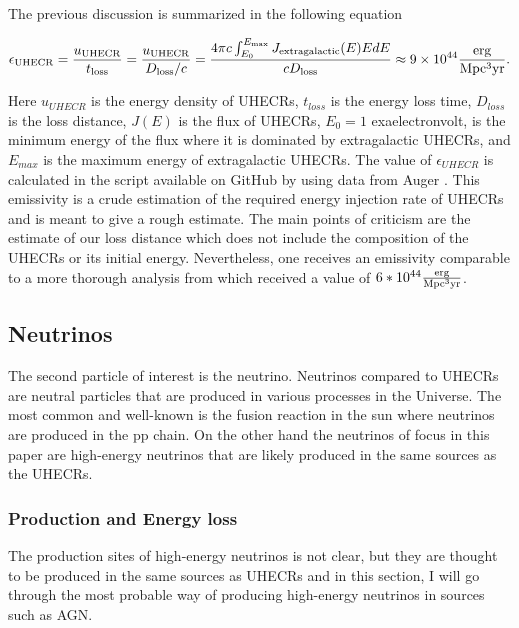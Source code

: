 The previous discussion is summarized in the following equation 

\begin{equation}
    \epsilon_{\rm UHECR} = \frac{u_{\rm UHECR}}{t_{\rm loss}} = \frac{u_{\rm UHECR}}{D_{\rm loss}/c} = \frac{4\pi c \int_{E_0}^{E_{\rm max}}J_{\rm extragalactic}(E)E dE}{c D_{\rm loss}} \approx 9\times 10^{44} \frac{\rm erg}{\rm Mpc^3 \rm yr}.
\end{equation}

Here $u_{UHECR}$ is the energy density of UHECRs, $t_{loss}$ is the energy loss time, $D_{loss}$ is the loss distance, $J(E)$ is the flux of UHECRs, $E_0 = 1$ exaelectronvolt, is the minimum energy of the flux where it is dominated by extragalactic UHECRs, and $E_{max}$ is the maximum energy of extragalactic UHECRs.
The value of $\epsilon_{UHECR}$ is calculated in the script available on GitHub \cite{Andrews_2023_github} by using data from  Auger \cite{thepierreaugercollaboration2017pierre}. This emissivity is a crude estimation of the required energy injection rate of UHECRs and is meant to give a rough estimate. 
The main points of criticism are the estimate of our loss distance which does not include the composition of the UHECRs or its initial energy. Nevertheless, one receives an emissivity comparable to a more thorough analysis from \cite{PhysRevLett.125.121106} which received a value of $6*10^{44} \frac{\rm erg}{\rm Mpc^3 \rm yr}$.




\subsection{Neutrinos}

The second particle of interest is the neutrino. Neutrinos compared to UHECRs are neutral particles that are produced in various processes in the Universe.
The most common and well-known is the fusion reaction in the sun where neutrinos are produced in the pp chain. On the other hand the neutrinos of focus in this paper 
are high-energy neutrinos that are likely produced in the same sources as the UHECRs.



\subsubsection{Production and Energy loss}
The production sites of high-energy neutrinos is not clear, but they are thought to be produced in the same sources as UHECRs 
and in this section, I will go through the most probable way of producing high-energy neutrinos in sources such as AGN.

